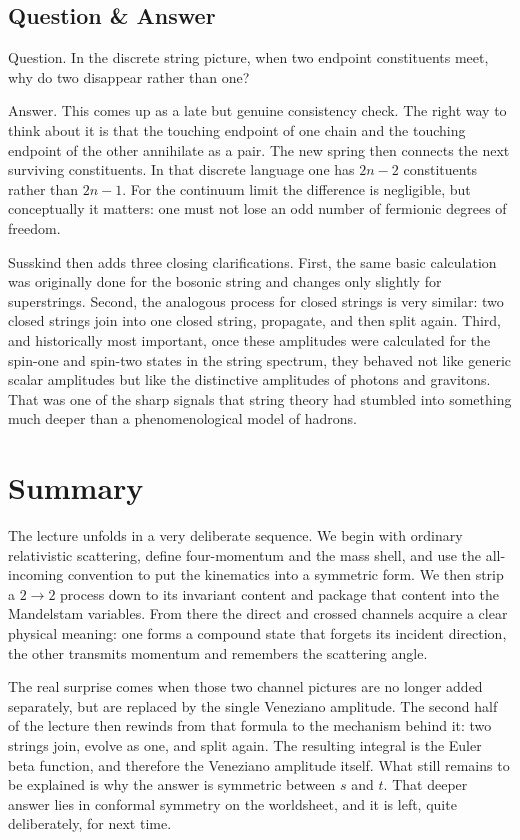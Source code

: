 \subsection{Question \& Answer}

Question. In the discrete string picture, when two endpoint constituents meet, why do two disappear rather than one?

Answer. This comes up as a late but genuine consistency check. The right way to think about it is that the touching endpoint of one chain and the touching endpoint of the other annihilate as a pair. The new spring then connects the next surviving constituents. In that discrete language one has \(2n-2\) constituents rather than \(2n-1\). For the continuum limit the difference is negligible, but conceptually it matters: one must not lose an odd number of fermionic degrees of freedom.

Susskind then adds three closing clarifications. First, the same basic calculation was originally done for the bosonic string and changes only slightly for superstrings. Second, the analogous process for closed strings is very similar: two closed strings join into one closed string, propagate, and then split again. Third, and historically most important, once these amplitudes were calculated for the spin-one and spin-two states in the string spectrum, they behaved not like generic scalar amplitudes but like the distinctive amplitudes of photons and gravitons. That was one of the sharp signals that string theory had stumbled into something much deeper than a phenomenological model of hadrons.

\section{Summary}

The lecture unfolds in a very deliberate sequence. We begin with ordinary relativistic scattering, define four-momentum and the mass shell, and use the all-incoming convention to put the kinematics into a symmetric form. We then strip a \(2\to2\) process down to its invariant content and package that content into the Mandelstam variables. From there the direct and crossed channels acquire a clear physical meaning: one forms a compound state that forgets its incident direction, the other transmits momentum and remembers the scattering angle.

The real surprise comes when those two channel pictures are no longer added separately, but are replaced by the single Veneziano amplitude. The second half of the lecture then rewinds from that formula to the mechanism behind it: two strings join, evolve as one, and split again. The resulting integral is the Euler beta function, and therefore the Veneziano amplitude itself. What still remains to be explained is why the answer is symmetric between \(s\) and \(t\). That deeper answer lies in conformal symmetry on the worldsheet, and it is left, quite deliberately, for next time.